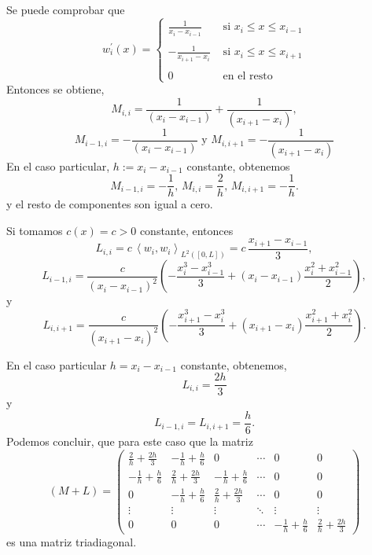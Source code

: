 \documentclass[10pt,handout]{beamer}
\theoremstyle{plain} %
\theoremstyle{plain} %
\theoremstyle{plain} %
\theoremstyle{plain} %
\theoremstyle{definition}
\theoremstyle{example}
\theoremstyle{example}
\theoremstyle{remark}
\theoremstyle{remark}
\begin{document}
\begin{frame}
Se puede comprobar que
$$
w_{i}^{\prime}(x)= \left\{
\begin{array}{cc}
\frac{1}{x_i-x_{i-1}} & \text{ si } x_i \le x \le x_{i-1} \\ 
& \\
-\frac{1}{x_{i+1}-x_i} & \text{ si } x_{i} \le x \le x_{i+1} \\ 
& \\
0 & \text{ en el resto}
\end{array}
\right.
$$
Entonces se obtiene,
$$
M_{i,i} = \frac{1}{(x_i-x_{i-1})} + \frac{1}{(x_{i+1}-x_i)},
$$
$$
M_{i-1,i} = - \frac{1}{(x_i-x_{i-1})} \text{ y } M_{i,i+1} = -\frac{1}{(x_{i+1}-x_i)}
$$
En el caso particular, $h:=x_i-x_{i-1}$ constante, obtenemos
$$
M_{i-1,i} = -\frac{1}{h}, \, M_{i,i} = \frac{2}{h}, \, M_{i,i+1} = -\frac{1}{h}. 
$$
y el resto de componentes son igual a cero.
\end{frame}

\begin{frame}
Si tomamos $c(x)=c >0$ constante, entonces
$$
L_{i,i} = c \, \left\langle  w_i , w_i \right\rangle_{L^2([0,L])} =
c \, \frac{x_{i+1}-x_{i-1}}{3},
$$
$$
L_{i-1,i} = \frac{c}{(x_i -x_{i-1})^2}\left( - \frac{x_i^3-x_{i-1}^3}{3} + (x_{i}-x_{i-1}) \frac{x_i^2+x_{i-1}^2}{2} \right),
$$
y
$$
L_{i,i+1} = \frac{c}{(x_{i+1} -x_{i})^2}\left( - \frac{x_{i+1}^3-x_{i}^3}{3} + (x_{i+1}-x_{i}) \frac{x_{i+1}^2+x_{i}^2}{2} \right).
$$
\end{frame}

\begin{frame}
En el caso particular $h=x_{i}-x_{i-1}$ constante, obtenemos,
$$
L_{i,i} = \frac{2h}{3}
$$
y
$$
L_{i-1,i}=L_{i,i+1} = \frac{h}{6}.
$$
Podemos concluir, que para este caso que la matriz
$$
(M+L) = \left(
\begin{array}{cccccc}
\frac{2}{h}+ \frac{2h}{3} & -\frac{1}{h} + \frac{h}{6} & 0 & \cdots  & 0 & 0 \\ 
 -\frac{1}{h} + \frac{h}{6} & \frac{2}{h}+ \frac{2h}{3} & -\frac{1}{h} + \frac{h}{6} & \cdots  & 0 & 0 \\
  0 & -\frac{1}{h} + \frac{h}{6} & \frac{2}{h}+ \frac{2h}{3} & \cdots  & 0 & 0 \\ 
  \vdots & \vdots & \vdots & \ddots & \vdots & \vdots \\ 
0 & 0 & 0 & \cdots &  -\frac{1}{h} + \frac{h}{6} & \frac{2}{h}+ \frac{2h}{3}
\end{array}
\right)
$$
es una matriz triadiagonal.
\end{frame}
\end{document}
